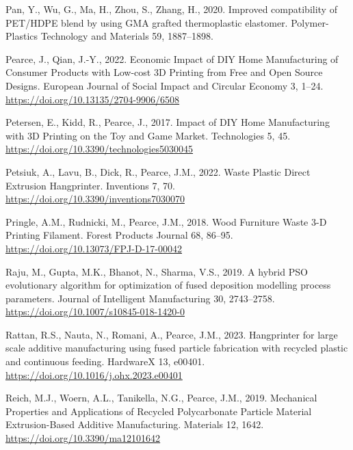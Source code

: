 \documentclass[
  12pt,
  number,
  review]{elsarticle}
\newlength{\cslhangindent}
\newlength{\cslentryspacingunit} %
\newenvironment{CSLReferences}[2] %
 {%
  \setlength{\parindent}{0pt}
  \ifodd #1
  \let\oldpar\par
  \def\par{\hangindent=\cslhangindent\oldpar}
  \fi
  \setlength{\parskip}{#2\cslentryspacingunit}
 }%
 {}
\begin{document}
\begin{CSLReferences}{1}{0}
\leavevmode{}%
Pan, Y., Wu, G., Ma, H., Zhou, S., Zhang, H., 2020. Improved
compatibility of PET/HDPE blend by using GMA grafted thermoplastic
elastomer. Polymer-Plastics Technology and Materials 59, 1887--1898.

\leavevmode{}%
Pearce, J., Qian, J.-Y., 2022. Economic {Impact} of {DIY Home
Manufacturing} of {Consumer Products} with {Low-cost 3D Printing} from
{Free} and {Open Source Designs}. European Journal of Social Impact and
Circular Economy 3, 1--24. \url{https://doi.org/10.13135/2704-9906/6508}

\leavevmode{}%
Petersen, E., Kidd, R., Pearce, J., 2017. Impact of {DIY Home
Manufacturing} with {3D Printing} on the {Toy} and {Game Market}.
Technologies 5, 45. \url{https://doi.org/10.3390/technologies5030045}

\leavevmode{}%
Petsiuk, A., Lavu, B., Dick, R., Pearce, J.M., 2022. Waste {Plastic
Direct Extrusion Hangprinter}. Inventions 7, 70.
\url{https://doi.org/10.3390/inventions7030070}

\leavevmode{}%
Pringle, A.M., Rudnicki, M., Pearce, J.M., 2018. Wood {Furniture
Waste} 3-{D Printing Filament}. Forest
Products Journal 68, 86--95.
\url{https://doi.org/10.13073/FPJ-D-17-00042}

\leavevmode{}%
Raju, M., Gupta, M.K., Bhanot, N., Sharma, V.S., 2019. A hybrid
{PSO} evolutionary algorithm for optimization of fused
deposition modelling process parameters. Journal of Intelligent
Manufacturing 30, 2743--2758.
\url{https://doi.org/10.1007/s10845-018-1420-0}

\leavevmode{}%
Rattan, R.S., Nauta, N., Romani, A., Pearce, J.M., 2023. Hangprinter for
large scale additive manufacturing using fused particle fabrication with
recycled plastic and continuous feeding. HardwareX 13, e00401.
\url{https://doi.org/10.1016/j.ohx.2023.e00401}

\leavevmode{}%
Reich, M.J., Woern, A.L., Tanikella, N.G., Pearce, J.M., 2019.
Mechanical {Properties} and {Applications} of {Recycled Polycarbonate
Particle Material Extrusion-Based Additive Manufacturing}. Materials 12,
1642. \url{https://doi.org/10.3390/ma12101642}


\end{CSLReferences}
\end{document}

